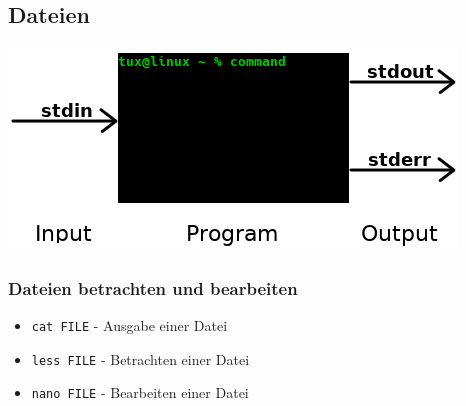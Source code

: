 \documentclass[12pt,utf8]{beamer}
\begin{document}
\subsection{Dateien}
\begin{frame}
	\centering\includegraphics[scale=0.65]{res/IOE}
\end{frame}

\begin{frame}
	\Huge\centering{$|$~~~$>$}
\end{frame}


\begin{frame}
\frametitle{\Large Dateien betrachten und bearbeiten}
\begin{itemize}
	\item \texttt{cat FILE} - Ausgabe einer Datei
	\item \texttt{less FILE} - Betrachten einer Datei
	\item \texttt{nano FILE} - Bearbeiten einer Datei
\end{itemize}
\end{frame}
\end{document}
